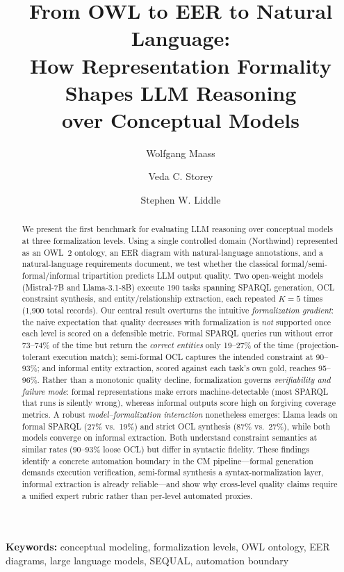 \documentclass[runningheads]{llncs}
\title{From OWL to EER to Natural Language:\\How Representation Formality Shapes LLM Reasoning\\over Conceptual Models}
\author{
Wolfgang Maass\inst{1} \and
Veda C. Storey\inst{2} \and
Stephen W. Liddle\inst{3}
}
\institute{
German Research Center for Artificial Intelligence (DFKI), Saarbr\"{u}cken, Germany \\
\email{wolfgang.maass@dfki.de}
\and
Georgia State University, Atlanta, GA, USA \\
\email{vstorey@gsu.edu}
\and
Brigham Young University, Provo, UT, USA \\
\email{liddle@byu.edu}
}
\begin{document}
\maketitle

\begin{abstract}
We present the first benchmark for evaluating LLM reasoning over conceptual models at three formalization levels. Using a single controlled domain (Northwind) represented as an OWL~2 ontology, an EER diagram with natural-language annotations, and a natural-language requirements document, we test whether the classical formal/semi-formal/informal tripartition \cite{mylopoulos1992conceptual} predicts LLM output quality. Two open-weight models (Mistral-7B and Llama-3.1-8B) execute 190 tasks spanning SPARQL generation, OCL constraint synthesis, and entity/relationship extraction, each repeated $K\!=\!5$ times (1,900 total records). Our central result overturns the intuitive \emph{formalization gradient}: the naive expectation that quality decreases with formalization is \emph{not} supported once each level is scored on a defensible metric. Formal SPARQL queries run without error 73--74\% of the time but return the \emph{correct entities} only 19--27\% of the time (projection-tolerant execution match); semi-formal OCL captures the intended constraint at 90--93\%; and informal entity extraction, scored against each task's own gold, reaches 95--96\%. Rather than a monotonic quality decline, formalization governs \emph{verifiability and failure mode}: formal representations make errors machine-detectable (most SPARQL that runs is silently wrong), whereas informal outputs score high on forgiving coverage metrics. A robust \emph{model--formalization interaction} nonetheless emerges: Llama leads on formal SPARQL (27\% vs.\ 19\%) and strict OCL synthesis (87\% vs.\ 27\%), while both models converge on informal extraction. Both understand constraint semantics at similar rates (90--93\% loose OCL) but differ in syntactic fidelity. These findings identify a concrete automation boundary in the CM pipeline---formal generation demands execution verification, semi-formal synthesis a syntax-normalization layer, informal extraction is already reliable---and show why cross-level quality claims require a unified expert rubric rather than per-level automated proxies.
\end{abstract}

\textbf{Keywords:} conceptual modeling, formalization levels, OWL ontology, EER diagrams, large language models, SEQUAL, automation boundary
\end{document}

